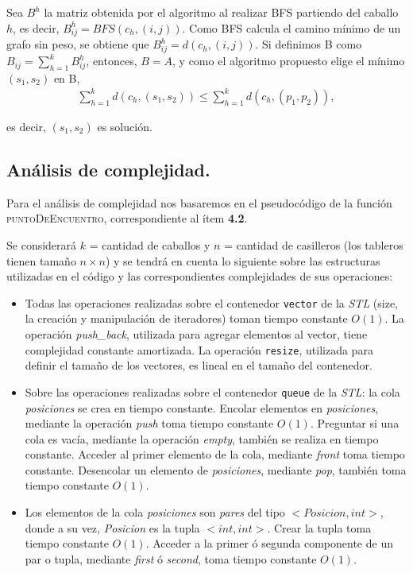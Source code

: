 Sea $B^h$ la matriz obtenida por el algoritmo al realizar BFS partiendo del
caballo $h$, es decir, $B^h_{ij} = BFS(c_h, (i, j))$. Como BFS calcula el
camino mínimo de un grafo sin peso, se obtiene que $B^h_{ij} = d(c_h, (i, j))$.
Si definimos B como $B_{ij} = \sum_{h=1}^k B^h_{ij}$, entonces, $B = A$, y como
el algoritmo propuesto elige el mínimo $(s_1, s_2)$ en B,
\begin{align*}
  \sum_{h=1}^k d(c_h, (s_1, s_2)) \le \sum_{h=1}^k d(c_h, (p_1, p_2)),
\end{align*}

es decir, $(s_1, s_2)$ es solución.


\newpage
\subsection{Análisis de complejidad.}

\vspace*{0.3cm}

Para el análisis de complejidad nos basaremos en el pseudocódigo de la función
\textsc{puntoDeEncuentro}, correspondiente al ítem \textbf{4.2}.

Se considerará $k$ = cantidad de caballos y $n$ = cantidad de casilleros (los tableros tienen tamaño $n \times n$) y se tendrá en cuenta lo siguiente sobre las estructuras utilizadas en el código y las correspondientes complejidades de sus operaciones:

\begin{itemize}
  \item Todas las operaciones realizadas sobre el contenedor \verb|vector| de la \textit{STL} (size, la creación y manipulación de iteradores) toman tiempo constante $O(1)$. La operación \textit{push_back}, utilizada para agregar elementos al vector, tiene complejidad constante amortizada. La
  operación \verb|resize|, utilizada para definir el tamaño de los vectores, es lineal en el tamaño del contenedor.

  \item Sobre las operaciones realizadas sobre el contenedor \verb|queue| de la \textit{STL}: la cola \textit{posiciones} se crea en tiempo constante. Encolar elementos en \textit{posiciones}, mediante la operación \textit{push}
  toma tiempo constante $O(1)$. Preguntar si una cola es vacía, mediante la operación \textit{empty}, también se realiza en tiempo constante. Acceder al primer elemento de la cola, mediante \textit{front} toma tiempo constante. Desencolar un elemento de \textit{posiciones}, mediante \textit{pop}, también toma tiempo constante $O(1)$.

  \item Los elementos de la cola \textit{posiciones} son \textit{pares} del
  tipo $<Posicion, int>$, donde a su vez, \textit{Posicion}
  es la tupla $<int, int>$. Crear la tupla toma tiempo constante $O(1)$.
  Acceder a la primer ó segunda componente de un par o tupla, mediante
  \textit{first} ó \textit{second}, toma tiempo constante $O(1)$.

\end{itemize}


